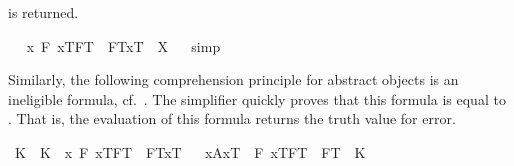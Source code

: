 \begin{isabellebody}
\begin{isamarkuptext}
 is returned.%
\end{isamarkuptext}%
\isamarkuptrue%
\ \isamarkupfalse%
\ {\isachardoublequoteopen}{\isacharparenleft}\isactrlbold {\isasymlambda}x{\isachardot}\ \isactrlbold {\isasymexists}F{\isachardot}\ {\isasymlbrace}x\isactrlsup T{\isacharcomma}F\isactrlsup T{\isasymrbrace}\ \isactrlbold {\isasymand}\ \isactrlbold {\isasymnot}{\isasymlparr}F\isactrlsup T{\isacharcomma}x\isactrlsup T{\isasymrparr}{\isacharparenright}\ {\isacharequal}\ X{\isachardoublequoteclose}%
\isadelimproof
\ %
\endisadelimproof
%
\isatagproof
{}\isamarkupfalse%
\ simp\ \isamarkupfalse%
\ \ %
%
\endisatagproof
{\isafoldproof}%
%
\isadelimproof
%
\endisadelimproof
%
\begin{isamarkuptext}%
Similarly, the following comprehension principle for abstract objects is an ineligible formula,  
  cf.~\cite[chap.4]{zalta11:_relat_versus_funct_found_logic}. The simplifier quickly proves that this
  formula  is equal to \isa{{\isacharasterisk}}. That is, 
  the evaluation of this formula returns the  truth value for error.%
\end{isamarkuptext}%
\isamarkuptrue%
\isamarkupfalse%
\ K\ \ {\isachardoublequoteopen}K\ {\isasymequiv}\ {\isacharparenleft}\isactrlbold {\isasymlambda}x{\isachardot}\ \isactrlbold {\isasymexists}F{\isachardot}\ {\isasymlbrace}x\isactrlsup T{\isacharcomma}F\isactrlsup T{\isasymrbrace}\ \isactrlbold {\isasymand}\ \isactrlbold {\isasymnot}{\isasymlparr}F\isactrlsup T{\isacharcomma}x\isactrlsup T{\isasymrparr}{\isacharparenright}{\isachardoublequoteclose}\isanewline
\isanewline
\ \isamarkupfalse%
\ {\isachardoublequoteopen}{\isacharbrackleft}{\isacharparenleft}\isactrlbold {\isasymexists}x{\isachardot}{\isacharparenleft}{\isasymlparr}A{\isacharbang}{\isacharcomma}x\isactrlsup T{\isasymrparr}\ \isactrlbold {\isasymand}\ {\isacharparenleft}\isactrlbold {\isasymforall}F{\isachardot}\ {\isacharparenleft}{\isasymlbrace}x\isactrlsup T{\isacharcomma}F\isactrlsup T{\isasymrbrace}\ \isactrlbold {\isasymequiv}\ {\isacharparenleft}F\isactrlsup T\ \isactrlbold {\isacharequal}\ K{\isacharparenright}{\isacharparenright}{\isacharparenright}{\isacharparenright}{\isacharparenright}{\isacharbrackright}\ {\isacharequal}\ {\isacharasterisk}{\isachardoublequoteclose}%

\end{isabellebody}
